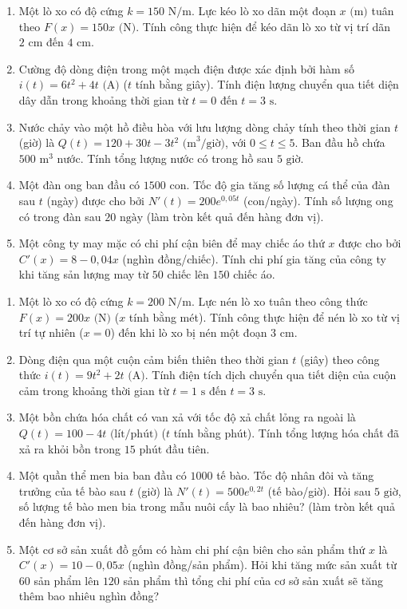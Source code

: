 \documentclass[12pt]{article}
\begin{document}
	\begin{btvang}
		\begin{enumerate}[label=\textbf{Bài \arabic*.}]
			\item Một lò xo có độ cứng $k = 150\text{ N/m}$. Lực kéo lò xo dãn một đoạn $x\text{ (m)}$ tuân theo $F(x) = 150x\text{ (N)}$. Tính công thực hiện để kéo dãn lò xo từ vị trí dãn $2\text{ cm}$ đến $4\text{ cm}$.
			\item Cường độ dòng điện trong một mạch điện được xác định bởi hàm số $i(t) = 6t^2 + 4t\text{ (A)}$ ($t$ tính bằng giây). Tính điện lượng chuyển qua tiết diện dây dẫn trong khoảng thời gian từ $t = 0$ đến $t = 3\text{ s}$.
			\item Nước chảy vào một hồ điều hòa với lưu lượng dòng chảy tính theo thời gian $t$ (giờ) là $Q(t) = 120 + 30t - 3t^2\text{ (m}^3\text{/giờ)}$, với $0 \le t \le 5$. Ban đầu hồ chứa $500\text{ m}^3$ nước. Tính tổng lượng nước có trong hồ sau $5\text{ giờ}$.
			\item Một đàn ong ban đầu có $1500$ con. Tốc độ gia tăng số lượng cá thể của đàn sau $t$ (ngày) được cho bởi $N'(t) = 200 e^{0{,}05t}$ (con/ngày). Tính số lượng ong có trong đàn sau $20\text{ ngày}$ (làm tròn kết quả đến hàng đơn vị).
			\item Một công ty may mặc có chi phí cận biên để may chiếc áo thứ $x$ được cho bởi $C'(x) = 8 - 0{,}04x$ (nghìn đồng/chiếc). Tính chi phí gia tăng của công ty khi tăng sản lượng may từ $50$ chiếc lên $150$ chiếc áo.
		\end{enumerate}
	\end{btvang}
	
	\newpage
	\begin{btdo}
		\begin{enumerate}[label=\textbf{Bài \arabic*.}]
			\item Một lò xo có độ cứng $k = 200\text{ N/m}$. Lực nén lò xo tuân theo công thức $F(x) = 200x\text{ (N)}$ ($x$ tính bằng mét). Tính công thực hiện để nén lò xo từ vị trí tự nhiên ($x = 0$) đến khi lò xo bị nén một đoạn $3\text{ cm}$.
			\item Dòng điện qua một cuộn cảm biến thiên theo thời gian $t$ (giây) theo công thức $i(t) = 9t^2 + 2t\text{ (A)}$. Tính điện tích dịch chuyển qua tiết diện của cuộn cảm trong khoảng thời gian từ $t = 1\text{ s}$ đến $t = 3\text{ s}$.
			\item Một bồn chứa hóa chất có van xả với tốc độ xả chất lỏng ra ngoài là $Q(t) = 100 - 4t\text{ (lít/phút)}$ ($t$ tính bằng phút). Tính tổng lượng hóa chất đã xả ra khỏi bồn trong $15\text{ phút}$ đầu tiên.
			\item Một quần thể men bia ban đầu có $1000$ tế bào. Tốc độ nhân đôi và tăng trưởng của tế bào sau $t$ (giờ) là $N'(t) = 500 e^{0{,}2t}$ (tế bào/giờ). Hỏi sau $5\text{ giờ}$, số lượng tế bào men bia trong mẫu nuôi cấy là bao nhiêu? (làm tròn kết quả đến hàng đơn vị).
			\item Một cơ sở sản xuất đồ gốm có hàm chi phí cận biên cho sản phẩm thứ $x$ là $C'(x) = 10 - 0{,}05x$ (nghìn đồng/sản phẩm). Hỏi khi tăng mức sản xuất từ $60$ sản phẩm lên $120$ sản phẩm thì tổng chi phí của cơ sở sản xuất sẽ tăng thêm bao nhiêu nghìn đồng?
		\end{enumerate}
	\end{btdo}
	
\end{document}
